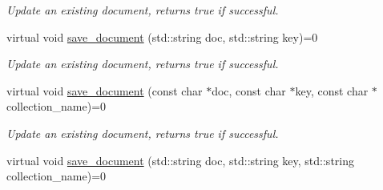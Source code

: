 \begin{DoxyCompactItemize}
\begin{DoxyCompactList}\small\item\em Update an existing document, returns true if successful. \end{DoxyCompactList}\item 
virtual void \hyperlink{classMongoInterface_a35888cb594d1f46d52147649786e948f}{save\+\_\+document} (std\+::string doc, std\+::string key)=0\hypertarget{classMongoInterface_a35888cb594d1f46d52147649786e948f}{}\label{classMongoInterface_a35888cb594d1f46d52147649786e948f}

\begin{DoxyCompactList}\small\item\em Update an existing document, returns true if successful. \end{DoxyCompactList}\item 
virtual void \hyperlink{classMongoInterface_a4d2c3e6a8fb172f8d07fc3dd710053ae}{save\+\_\+document} (const char $\ast$doc, const char $\ast$key, const char $\ast$collection\+\_\+name)=0\hypertarget{classMongoInterface_a4d2c3e6a8fb172f8d07fc3dd710053ae}{}\label{classMongoInterface_a4d2c3e6a8fb172f8d07fc3dd710053ae}

\begin{DoxyCompactList}\small\item\em Update an existing document, returns true if successful. \end{DoxyCompactList}\item 
virtual void \hyperlink{classMongoInterface_a14f3c2a76a495777a1f48ed155831134}{save\+\_\+document} (std\+::string doc, std\+::string key, std\+::string collection\+\_\+name)=0\hypertarget{classMongoInterface_a14f3c2a76a495777a1f48ed155831134}{}\label{classMongoInterface_a14f3c2a76a495777a1f48ed155831134}


\end{DoxyCompactItemize}
